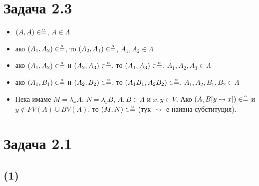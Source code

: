 \documentclass[12pt]{article}
\begin{document}
\newcommand\alphaeq{\mathrel{\stackrel{\makebox[0pt]{\mbox{\normalfont\tiny $\alpha$}}}{=}}}
\newcommand\betaeq{\mathrel{\stackrel{\makebox[0pt]{\mbox{\normalfont\tiny $\beta$}}}{=}}}
\newcommand\betaetaeq{\mathrel{\stackrel{\makebox[0pt]{\mbox{\normalfont\tiny $\beta\eta$}}}{=}}}


\section*{Задача 2.3}
\begin{itemize}
		\item $(A, A) \in \alphaeq$, $A \in \Lambda$
		\item ако $(A_1, A_2) \in \alphaeq$, то $(A_2, A_1) \in \alphaeq$, $A_1, A_2 \in \Lambda$
		\item ако $(A_1, A_2) \in \alphaeq$ и $(A_2, A_3) \in \alphaeq$, то $(A_1, A_3) \in \alphaeq$, $A_1, A_2, A_3 \in \Lambda$
		\item ако $(A_1, B_1) \in \alphaeq$ и $(A_2, B_2) \in \alphaeq$, то $(A_1 B_1, A_2 B_2) \in \alphaeq$, $A_1, A_2, B_1, B_2 \in \Lambda$
		\item Нека имаме $M = \lambda_x A$, $N = \lambda_y B$, $A, B \in \Lambda$ и $x, y \in V$. Ако $(A, B[y \rightsquigarrow x]) \in \alphaeq$ и $y \not\in FV(A) \cup BV(A)$, то $(M, N) \in \alphaeq$ (тук $\rightsquigarrow$ е наивна субституция).
\end{itemize}

\section*{Задача 2.1}
\subsection*{(1)}
\end{document}
